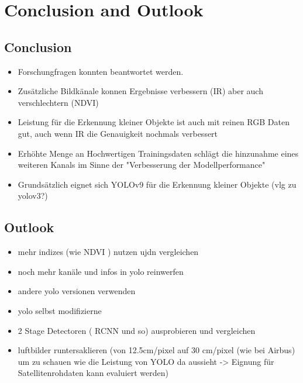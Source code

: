 \chapter{Conclusion and Outlook}
\label{ch:conclusion}

\section{Conclusion}
\begin{itemize}
    \item Forschungfragen konnten beantwortet werden. 
    \item Zusätzliche Bildkänale konnen Ergebnisse verbessern (IR) aber auch verschlechtern (NDVI)
    \item Leistung für die Erkennung kleiner Objekte ist auch mit reinen RGB Daten gut, auch wenn IR die Genauigkeit nochmals verbessert
    \item Erhöhte Menge an Hochwertigen Trainingsdaten schlägt die hinzunahme eines weiteren Kanals im Sinne der "Verbesserung der Modellperformance"
    \item Grundsätzlich eignet sich YOLOv9 für die Erkennung kleiner Objekte (vlg zu yolov3?)
\end{itemize}
\section{Outlook}
\begin{itemize}
    \item mehr indizes (wie NDVI ) nutzen ujdn vergleichen
    \item noch mehr kanäle und infos in yolo reinwerfen
    \item andere yolo versionen verwenden
    \item yolo selbst modifizierne
    \item 2 Stage Detectoren ( RCNN und so) ausprobieren und vergleichen
    \item luftbilder runtersaklieren (von 12.5cm/pixel auf 30 cm/pixel (wie bei Airbus) um zu schauen wie die Leistung von YOLO da aussieht -> Eignung für Satellitenrohdaten kann evaluiert werden)
\end{itemize}

